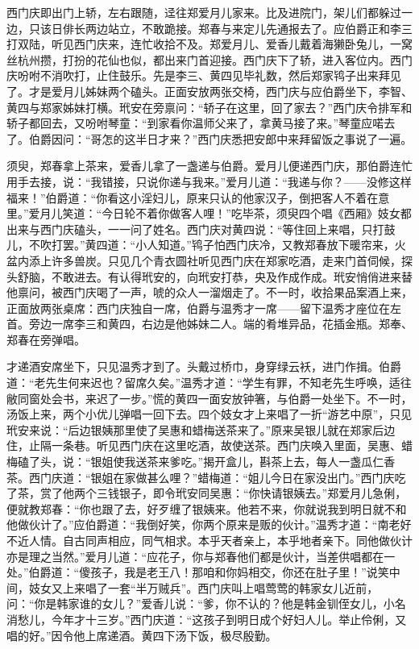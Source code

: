 西门庆即出门上轿，左右跟随，迳往郑爱月儿家来。比及进院门，架儿们都躲过一边，只该日俳长两边站立，不敢跪接。郑春与来定儿先通报去了。应伯爵正和李三打双陆，听见西门庆来，连忙收拾不及。郑爱月儿、爱香儿戴着海獭卧兔儿，一窝丝杭州攒，打扮的花仙也似，都出来门首迎接。西门庆下了轿，进入客位内。西门庆吩咐不消吹打，止住鼓乐。先是李三、黄四见毕礼数，然后郑家鸨子出来拜见了。才是爱月儿姊妹两个磕头。正面安放两张交椅，西门庆与应伯爵坐下，李智、黄四与郑家姊妹打横。玳安在旁禀问：“轿子在这里，回了家去？”西门庆令排军和轿子都回去，又吩咐琴童：“到家看你温师父来了，拿黄马接了来。”琴童应喏去了。伯爵因问：“哥怎的这半日才来？”西门庆悉把安郎中来拜留饭之事说了一遍。

须臾，郑春拿上茶来，爱香儿拿了一盏递与伯爵。爱月儿便递西门庆，那伯爵连忙用手去接，说：“我错接，只说你递与我来。”爱月儿道：“我递与你？——没修这样福来！”伯爵道：“你看这小淫妇儿，原来只认的他家汉子，倒把客人不着在意里。”爱月儿笑道：“今日轮不着你做客人哩！”吃毕茶，须臾四个唱《西厢》妓女都出来与西门庆磕头，一一问了姓名。西门庆对黄四说：“等住回上来唱，只打鼓儿，不吹打罢。”黄四道：“小人知道。”鸨子怕西门庆冷，又教郑春放下暖帘来，火盆内添上许多兽炭。只见几个青衣圆社听见西门庆在郑家吃酒，走来门首伺候，探头舒脑，不敢进去。有认得玳安的，向玳安打恭，央及作成作成。玳安悄俏进来替他禀问，被西门庆喝了一声，唬的众人一溜烟走了。不一时，收拾果品案酒上来，正面放两张桌席：西门庆独自一席，伯爵与温秀才一席——留下温秀才座位在左首。旁边一席李三和黄四，右边是他姊妹二人。端的肴堆异品，花插金瓶。郑奉、郑春在旁弹唱。

才递酒安席坐下，只见温秀才到了。头戴过桥巾，身穿绿云袄，进门作揖。伯爵道：“老先生何来迟也？留席久矣。”温秀才道：“学生有罪，不知老先生呼唤，适往敝同窗处会书，来迟了一步。”慌的黄四一面安放钟箸，与伯爵一处坐下。不一时，汤饭上来，两个小优儿弹唱一回下去。四个妓女才上来唱了一折“游艺中原”，只见玳安来说：“后边银姨那里使了吴惠和蜡梅送茶来了。”原来吴银儿就在郑家后边住，止隔一条巷。听见西门庆在这里吃酒，故使送茶。西门庆唤入里面，吴惠、蜡梅磕了头，说：“银姐使我送茶来爹吃。”揭开盒儿，斟茶上去，每人一盏瓜仁香茶。西门庆道：“银姐在家做甚么哩？”蜡梅道：“姐儿今日在家没出门。”西门庆吃了茶，赏了他两个三钱银子，即令玳安同吴惠：“你快请银姨去。”郑爱月儿急俐，便就教郑春：“你也跟了去，好歹缠了银姨来。他若不来，你就说我到明日就不和他做伙计了。”应伯爵道：“我倒好笑，你两个原来是贩\textMaoBi 的伙计。”温秀才道：“南老好不近人情。自古同声相应，同气相求。本乎天者亲上，本乎地者亲下。同他做伙计亦是理之当然。”爱月儿道：“应花子，你与郑春他们都是伙计，当差供唱都在一处。”伯爵道：“傻孩子，我是老王八！那咱和你妈相交，你还在肚子里！”说笑中间，妓女又上来唱了一套“半万贼兵”。西门庆叫上唱莺莺的韩家女儿近前，问：“你是韩家谁的女儿？”爱香儿说：“爹，你不认的？他是韩金钏侄女儿，小名消愁儿，今年才十三岁。”西门庆道：“这孩子到明日成个好妇人儿。举止伶俐，又唱的好。”因令他上席递酒。黄四下汤下饭，极尽殷勤。

